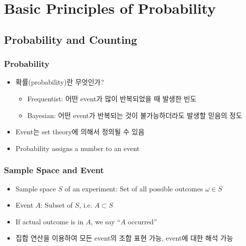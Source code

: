 \section{Basic Principles of Probability}

\subsection{Probability and Counting}

\subsubsection*{Probability}
\begin{itemize}
    \item 확률(probability)란 무엇인가?
    \begin{itemize}
        \item Frequentist: 어떤 event가 많이 반복되었을 때 발생한 빈도
        \item Bayesian: 어떤 event가 반복되는 것이 불가능하더라도 발생할 믿음의 정도
    \end{itemize}
    \item Event는 set theory에 의해서 정의될 수 있음
    \item Probability assigns a number to an event
\end{itemize}

\subsubsection*{Sample Space and Event}
\begin{itemize}
    \item Sample space $S$ of an experiment: Set of all possible outcomes $\omega\in S$
    \item Event $A$: Subset of $S$, i.e. $A\subset S$
    \item If actual outcome is in $A$, we say ``$A$ occurred''
    \item 집합 연산을 이용하여 모든 event의 조합 표현 가능, event에 대한 해석 가능
\end{itemize}

